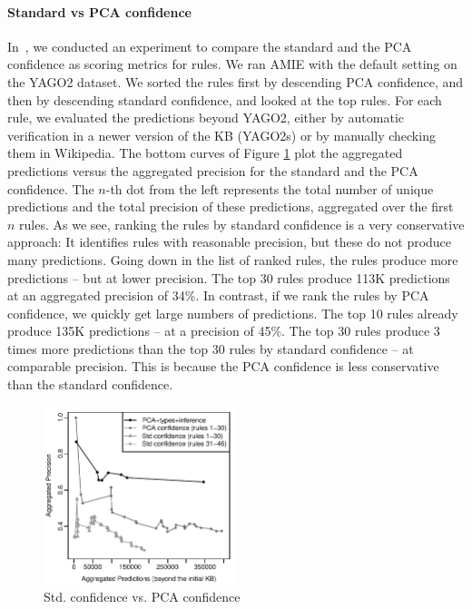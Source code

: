 \paragraph{Standard vs PCA confidence}
In~\cite{amie}, we conducted an experiment to compare the standard and the PCA confidence 
as scoring metrics for rules.
We ran AMIE with the default setting on the YAGO2 dataset. %
We sorted the rules first by descending PCA confidence, and then by descending standard confidence, and looked at the top rules.
For each rule, we evaluated the predictions beyond YAGO2, either by automatic verification in a
newer version of the KB (YAGO2s) or by manually checking them in Wikipedia.
The bottom curves of Figure \ref{finalshow} plot the aggregated predictions versus the aggregated precision for the standard and the PCA confidence.
The $n$-th dot from the left represents the total number of unique predictions and the total precision of these predictions, 
aggregated over the first $n$ rules.
As we see, ranking the rules by standard confidence is a very conservative approach:
It identifies rules with reasonable precision, but these do not produce many predictions.
Going down in the list of ranked rules, the rules produce more predictions -- but at lower precision. 
The top 30 rules produce 113K predictions at an aggregated precision of 34\%.
In contrast, if we rank the rules by PCA confidence, we quickly get large numbers of predictions. The top 10 rules already produce 135K predictions -- at a precision of 45\%.
The top 30 rules produce 3 times more predictions than the top 30 rules by standard confidence -- at comparable precision.
This is because the PCA confidence is less conservative than the standard confidence.

\begin{figure}
\includegraphics[width=0.5\textwidth]{figures/std_vs_pca}
\caption{Std. confidence vs. PCA confidence}
\label{finalshow}
\end{figure}

